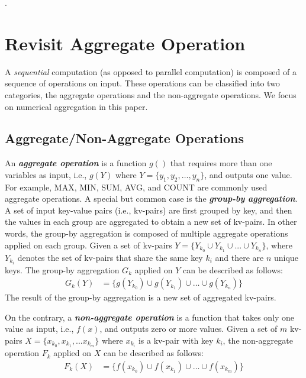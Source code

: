 .\section{Revisit Aggregate Operation}
\label{sec:aggre}

A \emph{sequential} computation (as opposed to parallel computation) is composed of a sequence of operations on input. These operations can be classified into two categories, the aggregate operations and the non-aggregate operations. We focus on numerical aggregation in this paper.

\subsection{Aggregate/Non-Aggregate Operations}
An \emph{\textbf{aggregate operation}} is a function $g()$ that requires more than one variables as input, i.e., $g(Y)$ where $Y=\{y_1, y_2, \ldots, y_n\}$, and outputs one value. For example, MAX, MIN, SUM, AVG, and COUNT are commonly used aggregate operations. A special but common case is the \emph{\textbf{group-by aggregation}}. A set of input key-value pairs (i.e., kv-pairs) are first grouped by key, and then the values in each group are aggregated to obtain a new set of kv-pairs. In other words, the group-by aggregation is composed of multiple aggregate operations applied on each group. Given a set of kv-pairs $Y=\{Y_{k_0} \cup Y_{k_1} \cup ... \cup Y_{k_n}\}$, where $Y_{k_i}$ denotes the set of kv-pairs that share the same key $k_i$ and there are $n$ unique keys. The group-by aggregation $G_k$ applied on $Y$ can be described as follows:
\begin{equation}
	\begin{aligned}
	 G_k(Y)&=\{g(Y_{k_0}) \cup g(Y_{k_1}) \cup \dots \cup g(Y_{k_n})\}
 \end{aligned}
\end{equation}
The result of the group-by aggregation is a new set of aggregated kv-pairs.

On the contrary, a \emph{\textbf{non-aggregate operation}} is a function that takes only one value as input, i.e., $f(x)$, and outputs zero or more values. Given a set of $m$ kv-pairs $X=\{x_{k_0}, x_{k_1}, ... x_{k_m}\}$ where $x_{k_i}$ is a kv-pair with key $k_i$, the non-aggregate operation $F_k$ applied on $X$ can be described as follows:
\begin{equation}
	\begin{aligned}	
	F_k(X)&=\{f(x_{k_0}) \cup f(x_{k_1}) \cup \dots \cup f(x_{k_m})\}
	\end{aligned}
\end{equation}


